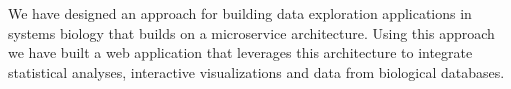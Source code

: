 
We have designed an approach for building data exploration applications in
systems biology that builds on a microservice architecture. Using this approach
we have built a web application that leverages this architecture to integrate
statistical analyses, interactive visualizations and data from biological
databases. 

